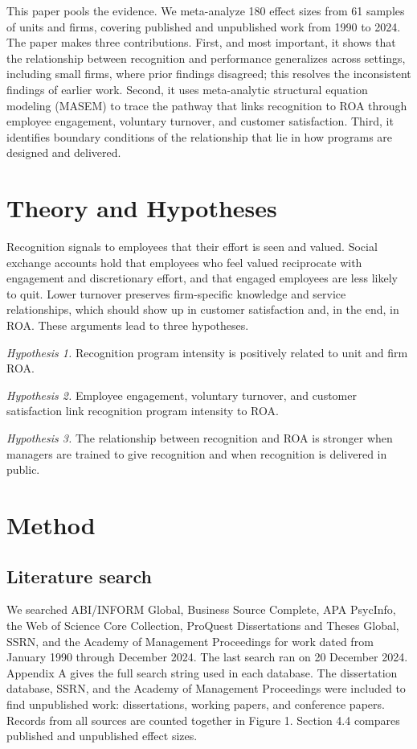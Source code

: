 \documentclass[11pt]{article}
\begin{document}
This paper pools the evidence. We meta-analyze 180 effect sizes from 61 samples of units and firms, covering published and unpublished work from 1990 to 2024. The paper makes three contributions. First, and most important, it shows that the relationship between recognition and performance generalizes across settings, including small firms, where prior findings disagreed; this resolves the inconsistent findings of earlier work. Second, it uses meta-analytic structural equation modeling (MASEM) to trace the pathway that links recognition to ROA through employee engagement, voluntary turnover, and customer satisfaction. Third, it identifies boundary conditions of the relationship that lie in how programs are designed and delivered.

\section{Theory and Hypotheses}

Recognition signals to employees that their effort is seen and valued. Social exchange accounts hold that employees who feel valued reciprocate with engagement and discretionary effort, and that engaged employees are less likely to quit. Lower turnover preserves firm-specific knowledge and service relationships, which should show up in customer satisfaction and, in the end, in ROA. These arguments lead to three hypotheses.

\medskip
\noindent\textit{Hypothesis 1.} Recognition program intensity is positively related to unit and firm ROA.

\noindent\textit{Hypothesis 2.} Employee engagement, voluntary turnover, and customer satisfaction link recognition program intensity to ROA.

\noindent\textit{Hypothesis 3.} The relationship between recognition and ROA is stronger when managers are trained to give recognition and when recognition is delivered in public.

\section{Method}

\subsection{Literature search}

We searched ABI/INFORM Global, Business Source Complete, APA PsycInfo, the Web of Science Core Collection, ProQuest Dissertations and Theses Global, SSRN, and the Academy of Management Proceedings for work dated from January 1990 through December 2024. The last search ran on 20 December 2024. Appendix A gives the full search string used in each database. The dissertation database, SSRN, and the Academy of Management Proceedings were included to find unpublished work: dissertations, working papers, and conference papers. Records from all sources are counted together in Figure 1. Section 4.4 compares published and unpublished effect sizes.
\end{document}
